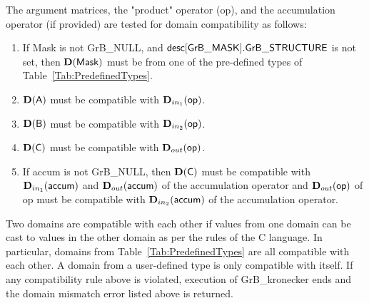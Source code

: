 The argument matrices, the "product" operator ({\sf op}), and the accumulation
operator (if provided) are tested for domain compatibility as follows:
\begin{enumerate}
	\item If {\sf Mask} is not {\sf GrB\_NULL}, and ${\sf desc[GrB\_MASK].GrB\_STRUCTURE}$
    is not set, then $\bold{D}({\sf Mask})$ must be from one of the pre-defined types of 
    Table~\ref{Tab:PredefinedTypes}.

	\item $\bold{D}({\sf A})$ must be compatible with $\mbox{$\mathbf{D}_{in_{1}}$}({\sf op})$.

	\item $\bold{D}({\sf B})$ must be compatible with $\mbox{$\mathbf{D}_{in_{2}}$}({\sf op})$.

	\item $\bold{D}({\sf C})$ must be compatible with $\mbox{$\mathbf{D}_{out}$}({\sf op})$.

	\item If {\sf accum} is not {\sf GrB\_NULL}, then $\bold{D}({\sf C})$ must be
    compatible with $\mbox{$\mathbf{D}_{in_{1}}$}({\sf accum})$ and $\mbox{$\mathbf{D}_{out}$}({\sf accum})$ of the 
    accumulation operator and $\mbox{$\mathbf{D}_{out}$}({\sf op})$ of {\sf op} must be compatible 
    with $\mbox{$\mathbf{D}_{in_{2}}$}({\sf accum})$ of the accumulation operator.
\end{enumerate}
Two domains are compatible with each other if values from one domain can be cast 
to values in the other domain as per the rules of the C language.
In particular, domains from Table~\ref{Tab:PredefinedTypes} are all compatible 
with each other. A domain from a user-defined type is only compatible with itself.
If any compatibility rule above is violated, execution of {\sf GrB\_kronecker} ends and 
the domain mismatch error listed above is returned.

